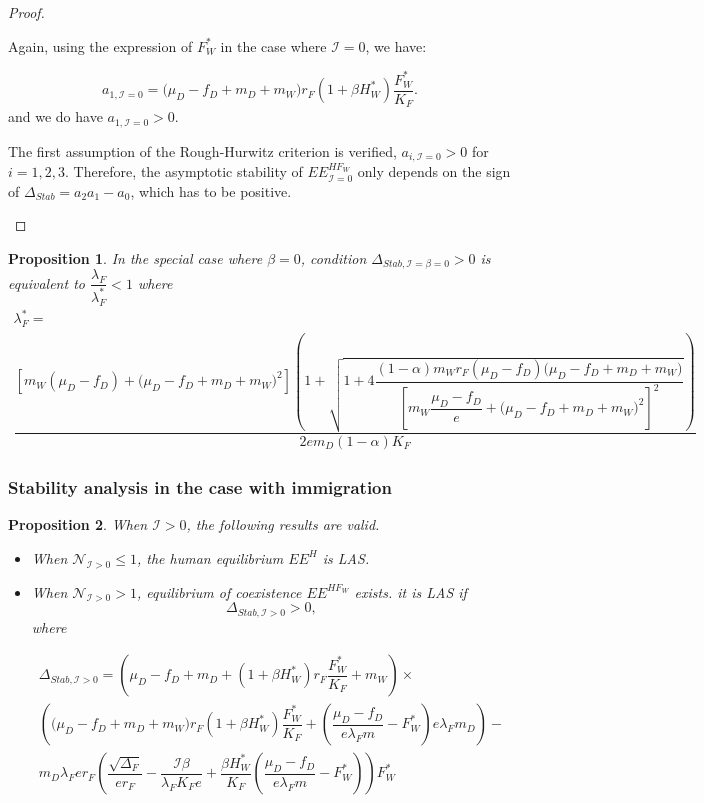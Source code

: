 \documentclass{article}
\newcommand{\lfw}{\lambda_{F}}
\newcommand{\lfw}{\lambda_{F}}
\newcommand{\cI}{\mathcal{I}}
\newtheorem{prop}{Proposition}
\begin{document}
\begin{proof}
\begin{itemize}
Again, using the expression of $F^*_W$ in the case where $\cI = 0$, we have:

\begin{equation*}
a_{1, \cI =0} = \big( \mu_D  -f_D + m_D + m_W) r_F(1+ \beta H_W^*) \dfrac{F^*_W}{K_F} .
\end{equation*}
and we do have $a_{1, \cI =0} > 0$.

The first assumption of the Rough-Hurwitz criterion is verified, $a_{i, \cI =0} > 0$ for $i=1,2,3$. Therefore, the asymptotic stability of $EE^{HF_W}_{\cI =0}$ only depends on the sign of $\Delta_{Stab}= a_2 a_1 - a_0$, which has to be positive. 
\end{itemize}
\end{proof}

\begin{prop}\label{prop:stab, cI = beta = 0}
In the special case where $\beta = 0$, condition $\Delta_{Stab, \cI =\beta =0} > 0$ is equivalent to $\dfrac{\lfw}{\lfw^*} < 1$ where
\begin{multline*}
\lfw^* = \\
 \dfrac{\left[m_{W}(\mu_{D}-f_{D})+\big(\mu_{D}-f_{D}+m_{D}+m_{W})^{2}\right]\left(1+\sqrt{1+4\dfrac{(1-\alpha)m_{W}r_{F}\left(\mu_{D}-f_{D}\right)\big(\mu_{D}-f_{D}+m_{D}+m_{W})}{\left[m_{W}\dfrac{\mu_{D}-f_{D}}{e}+\big(\mu_{D}-f_{D}+m_{D}+m_{W})^{2}\right]^{2}}}\right)}{2em_D (1-\alpha) K_F }
\end{multline*}
\end{prop}



\subsubsection{Stability analysis in the case with immigration}

\begin{prop}\label{prop:stab, cI>0} When $\cI > 0$, the following results are valid.
\begin{itemize}
\item When $\mathcal{N}_{\cI > 0} \leq 1$, the human equilibrium $EE^{H}$ is LAS.
\item When $\mathcal{N}_{\cI > 0} > 1$, equilibrium of coexistence $EE^{HF_W}$  exists. it is LAS if 
$$\Delta_{Stab, \cI > 0} > 0,$$  where 

\begin{multline*}
\Delta_{Stab, \cI > 0} = \left(\mu_D -f_D + m_D + (1+\beta H_W^*)r_F \dfrac{F_W^*}{K_F} + m_W  \right) \times \\ \left(\big( \mu_D  -f_D + m_D + m_W) r_F(1+ \beta H_W^*) \dfrac{F^*_W}{K_F} + \left(\dfrac{\mu_D -f_D}{e\lfw m} - F_W^*\right) e \lfw m_D \right) - \\m_D \lfw e r_F \left(\dfrac{\sqrt{\Delta_F}}{er_F} - \dfrac{\cI \beta}{\lfw K_F e} +  \dfrac{\beta H_W^*}{K_F} \left(\dfrac{\mu_D -f_D }{e \lfw m} - F_W^*\right)\right)  F^*_{W}
\end{multline*}
\end{itemize}
\end{prop}
\end{document}
